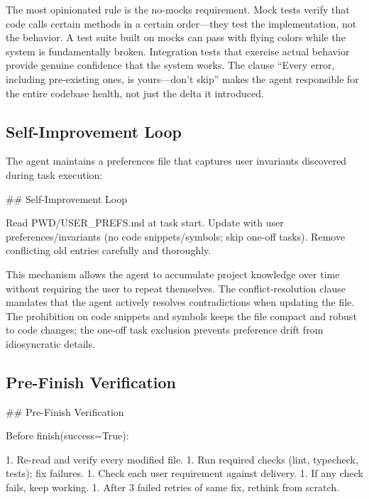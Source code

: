 \documentclass{article}
\begin{document}
The most opinionated rule is the no-mocks requirement.  Mock tests verify that code calls certain methods in a certain order---they test the implementation, not the behavior.  A test suite built on mocks can pass with flying colors while the system is fundamentally broken.  Integration tests that exercise actual behavior provide genuine confidence that the system works.  The clause ``Every error, including pre-existing ones, is yours---don't skip'' makes the agent responsible for the entire codebase health, not just the delta it introduced.

\subsection{Self-Improvement Loop}
\label{app:self-improvement}

The agent maintains a preferences file that captures user invariants discovered during task execution:

\begin{prompt}
## Self-Improvement Loop

Read PWD/USER_PREFS.md at task start. Update with user preferences/invariants (no code snippets/symbols; skip one-off tasks). Remove conflicting old entries carefully and thoroughly.
\end{prompt}

This mechanism allows the agent to accumulate project knowledge over time without requiring the user to repeat themselves.  The conflict-resolution clause mandates that the agent actively resolves contradictions when updating the file.  The prohibition on code snippets and symbols keeps the file compact and robust to code changes; the one-off task exclusion prevents preference drift from idiosyncratic details.

\subsection{Pre-Finish Verification}
\label{app:prefinish}

\begin{prompt}
## Pre-Finish Verification

Before finish(success=True):

1. Re-read and verify every modified file.
1. Run required checks (lint, typecheck, tests); fix failures.
1. Check each user requirement against delivery.
1. If any check fails, keep working.
1. After 3 failed retries of same fix, rethink from scratch.
\end{prompt}
\end{document}
